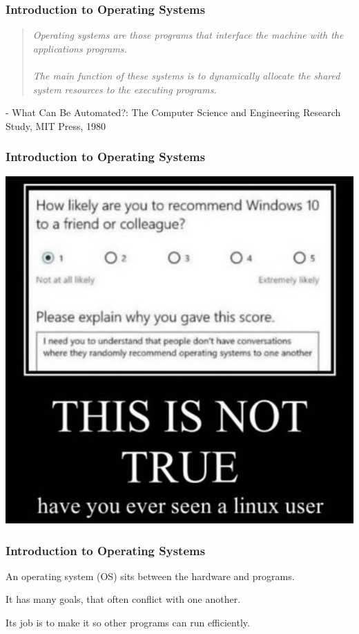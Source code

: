 \begin{frame}
\frametitle{Introduction to Operating Systems}

\begin{quote}
\textit{Operating systems are those programs that interface the machine with the applications programs.}
~\\~\\
\textit{The main function of these systems is to dynamically allocate the shared system resources to the executing programs.}
\end{quote}

\hfill - What Can Be Automated?: The Computer Science and Engineering Research Study, MIT Press, 1980

\end{frame}


\begin{frame}
\frametitle{Introduction to Operating Systems}

\begin{center}
	\includegraphics[width=.6\textwidth]{images/linux-user.jpg}
\end{center}


\end{frame}


\begin{frame}
\frametitle{Introduction to Operating Systems}

An operating system (OS) sits between the hardware and programs.

It has many goals, that often conflict with one another.

Its job is to make it so other programs can run efficiently.

\end{frame}

